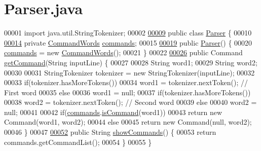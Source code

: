 \hypertarget{Parser_8java_source}{\section{Parser.\-java}
}

\begin{DoxyCode}
00001 \textcolor{keyword}{import} java.util.StringTokenizer;
00002 
\hypertarget{Parser_8java_source_l00009}{}\hyperlink{classParser}{00009} \textcolor{keyword}{public} \textcolor{keyword}{class }\hyperlink{classParser}{Parser} \{
00010 
\hypertarget{Parser_8java_source_l00014}{}\hyperlink{classParser_a6afb99e1595e6bc0705a09ee00dbddd6}{00014}     \textcolor{keyword}{private} \hyperlink{classCommandWords}{CommandWords} \hyperlink{classParser_a6afb99e1595e6bc0705a09ee00dbddd6}{commands};
00015 
\hypertarget{Parser_8java_source_l00019}{}\hyperlink{classParser_a5b20dc7a1c7a26ce3cec6cc070839bd4}{00019}     \textcolor{keyword}{public} \hyperlink{classParser_a5b20dc7a1c7a26ce3cec6cc070839bd4}{Parser}() \{
00020         \hyperlink{classParser_a6afb99e1595e6bc0705a09ee00dbddd6}{commands} = \textcolor{keyword}{new} \hyperlink{classCommandWords}{CommandWords}();
00021     \}
00022 
\hypertarget{Parser_8java_source_l00026}{}\hyperlink{classParser_a5ee0a1ad3df67b8814d34c81e7276371}{00026}     \textcolor{keyword}{public} Command \hyperlink{classParser_a5ee0a1ad3df67b8814d34c81e7276371}{getCommand}(String inputLine) \{
00027 
00028         String word1;
00029         String word2;
00030 
00031         StringTokenizer tokenizer = \textcolor{keyword}{new} StringTokenizer(inputLine);
00032 
00033         \textcolor{keywordflow}{if}(tokenizer.hasMoreTokens())
00034             word1 = tokenizer.nextToken();  \textcolor{comment}{// First word}
00035         \textcolor{keywordflow}{else}
00036             word1 = null;
00037         \textcolor{keywordflow}{if}(tokenizer.hasMoreTokens())
00038             word2 = tokenizer.nextToken();  \textcolor{comment}{// Second word}
00039         \textcolor{keywordflow}{else}
00040             word2 = null;
00041 
00042         \textcolor{keywordflow}{if}(\hyperlink{classParser_a6afb99e1595e6bc0705a09ee00dbddd6}{commands}.\hyperlink{classCommandWords_a98619d278b3fa23fed18b5834f9d20a8}{isCommand}(word1))
00043             \textcolor{keywordflow}{return} \textcolor{keyword}{new} Command(word1, word2);
00044         \textcolor{keywordflow}{else}
00045             \textcolor{keywordflow}{return} \textcolor{keyword}{new} Command(null, word2);
00046     \}
00047 
\hypertarget{Parser_8java_source_l00052}{}\hyperlink{classParser_ae99d8549c08045804cc52576d7b4b453}{00052}     \textcolor{keyword}{public} String \hyperlink{classParser_ae99d8549c08045804cc52576d7b4b453}{showCommands}() \{
00053         \textcolor{keywordflow}{return} commands.getCommandList();
00054     \}
00055 \}
\end{DoxyCode}
